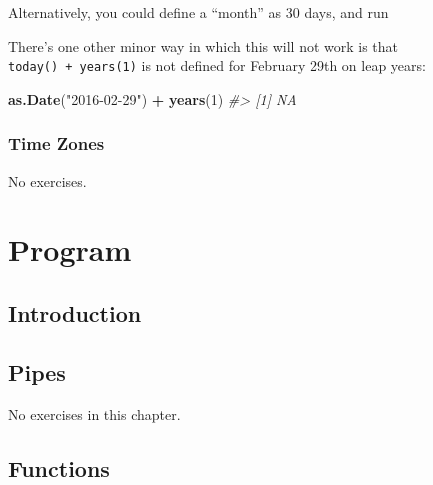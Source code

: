 \documentclass[]{book}
\newenvironment{Shaded}{\begin{snugshade}}{\end{snugshade}}
\newcommand{\CommentTok}[1]{\textcolor[rgb]{0.56,0.35,0.01}{\textit{#1}}}
\newcommand{\DecValTok}[1]{\textcolor[rgb]{0.00,0.00,0.81}{#1}}
\newcommand{\KeywordTok}[1]{\textcolor[rgb]{0.13,0.29,0.53}{\textbf{#1}}}
\newcommand{\NormalTok}[1]{#1}
\newcommand{\OperatorTok}[1]{\textcolor[rgb]{0.81,0.36,0.00}{\textbf{#1}}}
\newcommand{\StringTok}[1]{\textcolor[rgb]{0.31,0.60,0.02}{#1}}
\theoremstyle{plain}
\theoremstyle{remark}
\begin{document}
Alternatively, you could define a ``month'' as 30 days, and run

\begin{Shaded}
\end{Shaded}

There's one other minor way in which this will not work is that
\texttt{today()\ +\ years(1)} is not defined for February 29th on leap
years:

\begin{Shaded}
\begin{Highlighting}[]
\KeywordTok{as.Date}\NormalTok{(}\StringTok{"2016-02-29"}\NormalTok{) }\OperatorTok{+}\StringTok{ }\KeywordTok{years}\NormalTok{(}\DecValTok{1}\NormalTok{)}
\CommentTok{#> [1] NA}
\end{Highlighting}
\end{Shaded}

\hypertarget{time-zones}{%
\section{Time Zones}\label{time-zones}}

No exercises.

\hypertarget{part-program}{%
\part{Program}\label{part-program}}

\hypertarget{program-intro}{%
\chapter{Introduction}\label{program-intro}}

\hypertarget{pipes}{%
\chapter{Pipes}\label{pipes}}

No exercises in this chapter.

\hypertarget{functions}{%
\chapter{Functions}\label{functions}}
\end{document}
